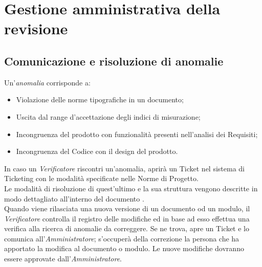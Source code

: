 \section{Gestione amministrativa della revisione}{
\subsection{Comunicazione e risoluzione di anomalie}{
Un'\textit{anomalia} corrisponde a:
\begin{itemize}
	\item Violazione delle norme tipografiche in un documento;
	\item Uscita dal range d'accettazione degli indici di misurazione;
	\item Incongruenza del prodotto con funzionalità presenti nell'analisi dei Requisiti;
	\item Incongruenza del Codice con il design del prodotto.
\end{itemize}

In caso un \emph{Verificatore} riscontri un'anomalia, aprirà un Ticket nel sistema di Ticketing con le modalità specificate nelle Norme di Progetto. \\
Le modalità di risoluzione di quest'ultimo e la sua struttura vengono descritte in modo dettagliato all'interno del documento \href{run:../../Interni/\fNormeDiProgetto}{\fEscapeNormeDiProgetto}. \\
Quando viene rilasciata una nuova versione di un documento od un modulo, il \emph{Verificatore} controlla il registro delle modifiche ed in base ad esso effettua una verifica alla ricerca di anomalie da correggere. Se ne trova, apre un Ticket e lo comunica all'\emph{Amministratore}; s'occuperà della correzione la persona che ha apportato la modifica al documento o modulo. Le nuove modifiche dovranno essere approvate dall'\emph{Amministratore}.
}
}